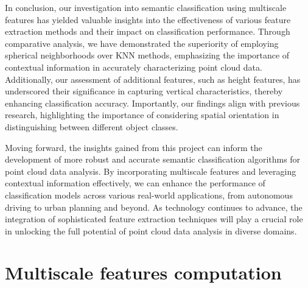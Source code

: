 \documentclass{article}
\begin{document}
In conclusion, our investigation into semantic classification using multiscale features has yielded valuable insights into the effectiveness of various feature extraction methods and their impact on classification performance. Through comparative analysis, we have demonstrated the superiority of employing spherical neighborhoods over KNN methods, emphasizing the importance of contextual information in accurately characterizing point cloud data. Additionally, our assessment of additional features, such as height features, has underscored their significance in capturing vertical characteristics, thereby enhancing classification accuracy. Importantly, our findings align with previous research, highlighting the importance of considering spatial orientation in distinguishing between different object classes.

Moving forward, the insights gained from this project can inform the development of more robust and accurate semantic classification algorithms for point cloud data analysis. By incorporating multiscale features and leveraging contextual information effectively, we can enhance the performance of classification models across various real-world applications, from autonomous driving to urban planning and beyond. As technology continues to advance, the integration of sophisticated feature extraction techniques will play a crucial role in unlocking the full potential of point cloud data analysis in diverse domains.

\newpage



\appendix

\section{Multiscale features computation}
\end{document}
